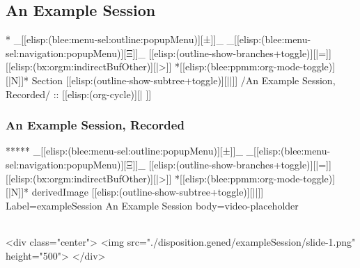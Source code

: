 \begin{whenOrg}
\newpage
\part{An Example Session}

\begin{whenOrg}
*  _[[elisp:(blee:menu-sel:outline:popupMenu)][±]]_ _[[elisp:(blee:menu-sel:navigation:popupMenu)][Ξ]]_ [[elisp:(outline-show-branches+toggle)][|=]] [[elisp:(bx:orgm:indirectBufOther)][|>]] *[[elisp:(blee:ppmm:org-mode-toggle)][|N]]*  Section    [[elisp:(outline-show-subtree+toggle)][||]]   /An Example Session, Recorded/ ::  [[elisp:(org-cycle)][| ]]
\end{whenOrg}

\section{An Example Session, Recorded}

\begin{whenOrg}
*****  _[[elisp:(blee:menu-sel:outline:popupMenu)][±]]_ _[[elisp:(blee:menu-sel:navigation:popupMenu)][Ξ]]_ [[elisp:(outline-show-branches+toggle)][|=]] [[elisp:(bx:orgm:indirectBufOther)][|>]] *[[elisp:(blee:ppmm:org-mode-toggle)][|N]]*  derivedImage [[elisp:(outline-show-subtree+toggle)][||]] Label=exampleSession An Example Session body=video-placeholder
\end{whenOrg}

\begin{htmlonly}

\begin{frame}[fragile,plain,label=exampleSession]
    \frametitle{}
    \framesubtitle{}
    \begin{rawhtml}
<div class="center">
<img src="./disposition.gened/exampleSession/slide-1.png" height="500">
</div>
    \end{rawhtml}
\end{frame}
\end{htmlonly}

\begin{verblatex}


\end{verblatex}
\end{whenOrg}
